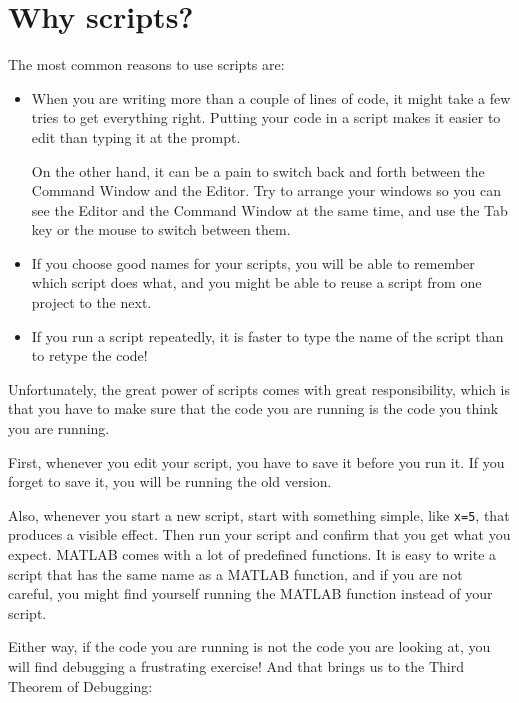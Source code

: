 \documentclass[
]{book}
\begin{document}
\section{Why scripts?}

The most common reasons to use scripts are:

\begin{itemize}

\item When you are writing more than a couple of lines of code, it
might take a few tries to get everything right.  Putting your code
in a script makes it easier to edit than typing it at the prompt.

On the other hand, it can be a pain to switch back and forth between
the Command Window and the Editor.  Try to arrange your windows so
you can see the Editor and the Command Window at the same time, and
use the Tab key or the mouse to switch between them.

\item If you choose good names for your scripts, you will be able
to remember which script does what, and you might be able to reuse
a script from one project to the next.

\item If you run a script repeatedly, it is faster to type the
name of the script than to retype the code!

\end{itemize}

Unfortunately, the great power of scripts comes with great responsibility,
which is that you have to make sure that the code you are running is
the code you think you are running.

First, whenever you edit your script, you have to save it before you
run it.  If you forget to save it, you will be running the old version.

Also, whenever you start a new script, start with something simple,
like {\tt x=5}, that produces a visible effect.  Then run your script
and confirm that you get what you expect.  MATLAB comes with a lot of
predefined functions.  It is easy to write a script that has the same
name as a MATLAB function, and if you are not careful, you might
find yourself running the MATLAB function instead of your script.

Either way, if the code you are running is not the code you are looking
at, you will find debugging a frustrating exercise!  And that brings
us to the Third Theorem of Debugging:
\end{document}
